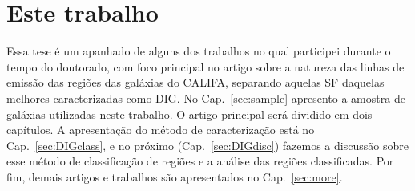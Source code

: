 \section{Este trabalho}
\label{sec:intro:estetrabalho}

Essa tese é um apanhado de alguns dos trabalhos no qual participei durante o tempo do doutorado, com foco principal no artigo sobre a natureza das linhas de emissão das regiões das galáxias do CALIFA, separando aquelas SF daquelas melhores caracterizadas como DIG. No Cap.\ \ref{sec:sample} apresento a amostra de galáxias utilizadas neste trabalho. O artigo principal será dividido em dois capítulos. A apresentação do método de caracterização está no Cap.\  \ref{sec:DIGclass}, e no próximo (Cap.\ \ref{sec:DIGdisc}) fazemos a discussão sobre esse método de classificação de regiões e a análise das regiões classificadas. Por fim, demais artigos e trabalhos são apresentados no Cap.\ \ref{sec:more}.
